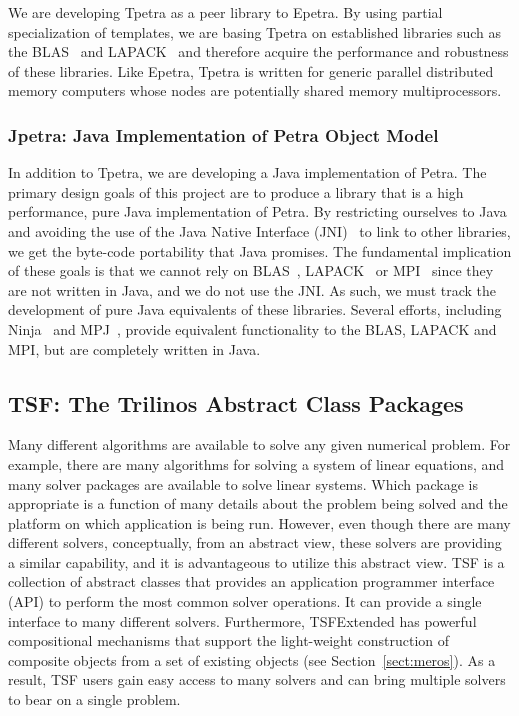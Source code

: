 \documentclass[acmtoms,acmnow]{acmtrans2m}
\begin{document}
We are developing Tpetra as a peer library to Epetra. By using partial
specialization of templates, we are basing Tpetra on established libraries 
such as the BLAS~\cite{BLAS1,BLAS2,BLAS3} and LAPACK~\cite{lapack} and 
therefore acquire the performance and robustness of these libraries.
Like Epetra, Tpetra is written for generic parallel distributed
memory computers whose nodes are
potentially shared memory multiprocessors.

\subsubsection{Jpetra: Java Implementation of Petra Object Model}

In addition to Tpetra, we are developing a Java implementation of Petra.  
The primary design goals of this project are to produce a library that 
is a high performance, pure Java implementation of Petra.  By restricting 
ourselves to Java and avoiding the use of the Java Native Interface 
(JNI)~\cite{JNI-site} to link to other libraries, we get the byte-code 
portability that Java promises.  The fundamental implication of these 
goals is that we cannot rely on BLAS~\cite{BLAS1,BLAS2,BLAS3}, 
LAPACK~\cite{lapack} or MPI~\cite{MPI} since they are not written in 
Java, and we do not use the JNI.  As such, we must track the development 
of pure Java equivalents of these libraries.  Several efforts, including 
Ninja~\cite{MoreMidkGuptArtiWuAlma2001} and 
MPJ~\cite{CarpGetoJuddSkjeFox2000}, provide equivalent functionality 
to the BLAS, LAPACK and MPI, but are completely written in Java.

\subsection{TSF: The Trilinos Abstract Class Packages}

Many different algorithms are available to solve any given numerical
problem.  For example, there are many algorithms for solving a system
of linear equations, and many solver packages are available to solve
linear systems.  Which package is appropriate is a function of
many details about the problem being solved and the platform on which
application is being run. However, even though
there are many different solvers, conceptually, from an abstract view,
these solvers are providing a similar capability, and it is
advantageous to utilize this abstract view.
TSF is a collection of abstract classes that provides an application
programmer interface (API) to perform the most common solver
operations.  It can provide a single interface to many different
solvers.  Furthermore, TSFExtended has powerful compositional
mechanisms that support the
light-weight construction of composite objects from a set of
existing objects (see Section~\ref{sect:meros}).
As a result, TSF users gain easy access to many
solvers and can bring multiple solvers to bear on a single problem.
\end{document}
